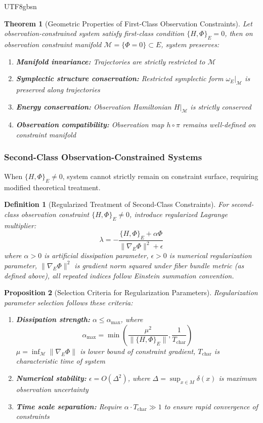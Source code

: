 \documentclass[a4paper,12pt]{extarticle}
\newtheorem{theorem}{Theorem}
\newtheorem{proposition}[theorem]{Proposition}
\newtheorem{definition}{Definition}
\theoremstyle{definition}
\begin{document}
\begin{CJK}{UTF8}{gbsn}
\begin{theorem}[Geometric Properties of First-Class Observation Constraints]
Let observation-constrained system satisfy first-class condition $\{H,\Phi\}_E = 0$, then on observation constraint manifold $\mathcal{M} = \{\Phi=0\} \subset E$, system preserves:
\begin{enumerate}
\item \textbf{Manifold invariance:} Trajectories are strictly restricted to $\mathcal{M}$
\item \textbf{Symplectic structure conservation:} Restricted symplectic form $\omega_E|_{\mathcal{M}}$ is preserved along trajectories  
\item \textbf{Energy conservation:} Observation Hamiltonian $H|_{\mathcal{M}}$ is strictly conserved
\item \textbf{Observation compatibility:} Observation map $h \circ \pi$ remains well-defined on constraint manifold
\end{enumerate}
\end{theorem}

\subsubsection{Second-Class Observation-Constrained Systems}

When $\{H,\Phi\}_E \neq 0$, system cannot strictly remain on constraint surface, requiring modified theoretical treatment.

\begin{definition}[Regularized Treatment of Second-Class Constraints]
For second-class observation constraint $\{H,\Phi\}_E \neq 0$, introduce regularized Lagrange multiplier:
$$\lambda = -\frac{\{H,\Phi\}_E + \alpha\Phi}{\|\nabla_E\Phi\|^2 + \epsilon}$$
where $\alpha > 0$ is artificial dissipation parameter, $\epsilon > 0$ is numerical regularization parameter, $\|\nabla_E\Phi\|^2$ is gradient norm squared under fiber bundle metric (as defined above), all repeated indices follow Einstein summation convention.
\end{definition}

\begin{proposition}[Selection Criteria for Regularization Parameters]
Regularization parameter selection follows these criteria:
\begin{enumerate}
\item \textbf{Dissipation strength:} $\alpha \leq \alpha_{\max}$, where
$$\alpha_{\max} = \min\left(\frac{\mu^2}{\|\{H,\Phi\}_E\|}, \frac{1}{T_{\text{char}}}\right)$$
$\mu = \inf_{\mathcal{M}}\|\nabla_E\Phi\|$ is lower bound of constraint gradient, $T_{\text{char}}$ is characteristic time of system
\item \textbf{Numerical stability:} $\epsilon = O(\Delta^2)$, where $\Delta = \sup_{x \in M}\delta(x)$ is maximum observation uncertainty
\item \textbf{Time scale separation:} Require $\alpha \cdot T_{\text{char}} \gg 1$ to ensure rapid convergence of constraints
\end{enumerate}
\end{proposition}


\end{CJK}
\end{document}
